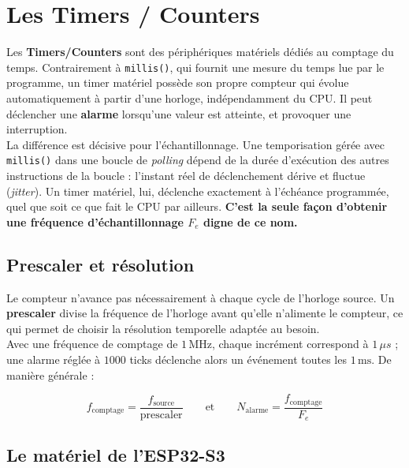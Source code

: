 \newpage

\section{Les Timers / Counters}

Les \textbf{Timers/Counters} sont des périphériques matériels dédiés au comptage du temps. Contrairement à \texttt{millis()}, qui fournit une mesure du temps lue par le programme, un timer matériel possède son propre compteur qui évolue automatiquement à partir d'une horloge, indépendamment du CPU. Il peut déclencher une \textbf{alarme} lorsqu'une valeur est atteinte, et provoquer une interruption.\\

La différence est décisive pour l'échantillonnage. Une temporisation gérée avec \texttt{millis()} dans une boucle de \textit{polling} dépend de la durée d'exécution des autres instructions de la boucle : l'instant réel de déclenchement dérive et fluctue (\textit{jitter}). Un timer matériel, lui, déclenche exactement à l'échéance programmée, quel que soit ce que fait le CPU par ailleurs. \textbf{C'est la seule façon d'obtenir une fréquence d'échantillonnage $F_e$ digne de ce nom.}

\subsection{Prescaler et résolution}

Le compteur n'avance pas nécessairement à chaque cycle de l'horloge source. Un \textbf{prescaler} divise la fréquence de l'horloge avant qu'elle n'alimente le compteur, ce qui permet de choisir la résolution temporelle adaptée au besoin.\\

Avec une fréquence de comptage de $1\,\mathrm{MHz}$, chaque incrément correspond à $1\,\mu s$ ; une alarme réglée à $1000$ ticks déclenche alors un événement toutes les $1\,\mathrm{ms}$. De manière générale :

\begin{equation}
f_{\text{comptage}} = \frac{f_{\text{source}}}{\text{prescaler}}
\qquad\text{et}\qquad
N_{\text{alarme}} = \frac{f_{\text{comptage}}}{F_e}
\end{equation}

\subsection{Le matériel de l'ESP32-S3}

